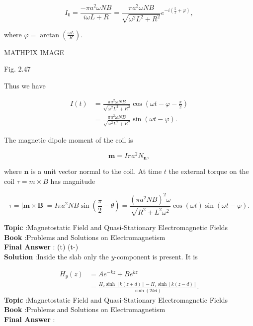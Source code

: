 \documentclass[10pt]{article}
\begin{document}
$$
I_{0}=\frac{-\pi a^{2} \omega N B}{i \omega L+R}=\frac{\pi a^{2} \omega N B}{\sqrt{\omega^{2} L^{2}+R^{2}}} e^{-i\left(\frac{5}{2}+\varphi\right)},
$$

where $\varphi=\arctan \left(\frac{\omega L}{R}\right)$.

MATHPIX IMAGE

Fig. $2.47$

Thus we have

$$
\begin{aligned}
I(t) &=\frac{\pi a^{2} \omega N B}{\sqrt{\omega^{2} L^{2}+R^{2}}} \cos \left(\omega t-\varphi-\frac{\pi}{2}\right) \\
&=\frac{\pi a^{2} \omega N B}{\sqrt{\omega^{2} L^{2}+R^{2}}} \sin (\omega t-\varphi) .
\end{aligned}
$$

 The magnetic dipole moment of the coil is

$$
\mathbf{m}=I \pi a^{2} N_{\mathbf{n}},
$$

where $\mathbf{n}$ is a unit vector normal to the coil. At time $t$ the external torque on the coil $\tau=m \times B$ has magnitude

$$
\tau=|\mathbf{m} \times \mathbf{B}|=I \pi a^{2} N B \sin \left(\frac{\pi}{2}-\theta\right)=\frac{\left(\pi a^{2} N B\right)^{2} \omega}{\sqrt{R^{2}+L^{2} \omega^{2}}} \cos (\omega t) \sin (\omega t-\varphi) .
$$

\textbf{Topic} :Magnetostatic Field and Quasi-Stationary Electromagnetic Fields\\
\textbf{Book} :Problems and Solutions on Electromagnetism\\
\textbf{Final Answer} : \cos (\omega t) \sin (\omega t-\varphi)\\


\textbf{Solution} :Inside the slab only the $y$-component is present. It is

$$
\begin{aligned}
H_{y}(z) &=A e^{-k z}+B e^{k z} \\
&=\frac{H_{2} \sinh [k(z+d)]-H_{1} \sinh [k(z-d)]}{\sinh (2 k d)} .
\end{aligned}
$$
\textbf{Topic} :Magnetostatic Field and Quasi-Stationary Electromagnetic Fields\\
\textbf{Book} :Problems and Solutions on Electromagnetism\\
\textbf{Final Answer} :\\
\end{document}
